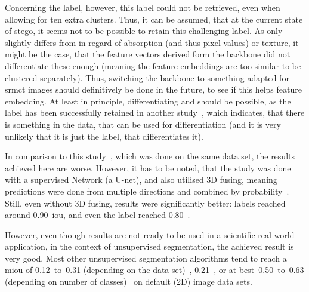 Concerning the  label, however, this label could not be retrieved, even when allowing for ten extra clusters.
Thus, it can be assumed, that at the current state of \gls{stego}, it seems not to be possible to retain this challenging label.
As  only slightly differs from  in regard of absorption (and thus pixel values) or texture, it might be the case, that the feature vectors derived form the backbone did not differentiate these enough (meaning the feature embeddings are too similar to be clustered separately).
Thus, switching the backbone to something adapted for \gls{srmct} images should definitively be done in the future, to see if this helps feature embedding.
At least in principle, differentiating  and  should be possible, as the  label has been successfully retained in another study~\autocite{Baltruschat2021}, which indicates, that there is something in the data, that can be used for differentiation (and it is very unlikely that it is just the label, that differentiates it).

In comparison to this study~\autocite{Baltruschat2021}, which was done on the same data set, the results achieved here are worse.
However, it has to be noted, that the study was done with a supervised Network (a U-net), and also utilised 3D fusing, meaning predictions were done from multiple directions and combined by probability~\autocite{Baltruschat2021}.
Still, even without 3D fusing, results were significantly better: labels reached around 0.90~\gls{iou}, and even the  label reached 0.80~\autocite{Baltruschat2021}.

However, even though results are not ready to be used in a scientific real-world application, in the context of unsupervised segmentation, the achieved result is very good.
Most other unsupervised segmentation algorithms tend to reach a \gls{miou} of 0.12~to~0.31 (depending on the data set)~\autocite{Cho2021}, 0.21~\autocite{Hamilton2022}, or at best~0.50~to~0.63 (depending on number of classes)~\autocite{VanGansbeke2021} on default (2D) image data sets.

